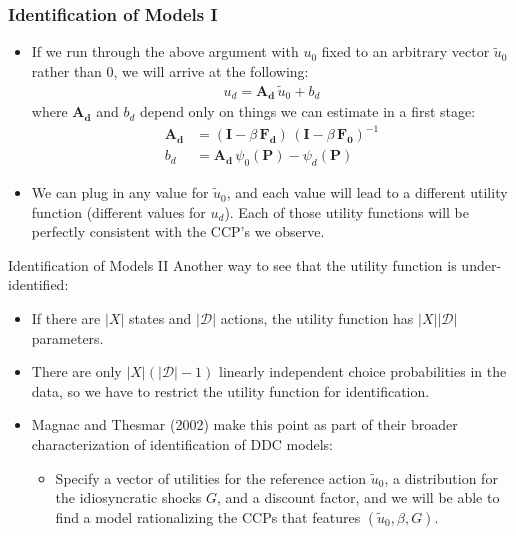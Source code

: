 \documentclass[aspectratio=169,11pt]{beamer}
\begin{document}
\begin{frame}
\frametitle{Identification of Models I}
\begin{itemize}
	\item If we  run through the above argument with $u_{0}$ fixed to
	an arbitrary vector $\widetilde{u}_{0}$ rather than 0, we will arrive at the
	following:
	\begin{align*}
		u_{d} = \symbf{A_{d}} \, \widetilde{u}_{0} + b_{d}
	\end{align*}
	where $ \symbf{A_{d}} $ and $b_{d} $ depend only on things we can estimate in a first
	stage:
	\begin{align*}
	\symbf{A_{d}} & = \left(\symbf{I}-\beta\, \symbf{F_{d}}\right) \, \left(\symbf{I}-\beta\,  \symbf{F_{0}}\right)^{-1}\\
	b_{d} & = \symbf{A_{d}}\, \psi_{0}\left(\symbf{P}\right)-\psi_{d}\left(\symbf{P}\right)
	\end{align*}
	\item We can plug in any value for $\widetilde{u}_{0}$, and each value
	will lead to a different utility function (different values for $u_{d}$). Each
	of those utility functions will be perfectly consistent with the CCP's we observe.
\end{itemize}
\end{frame}

\begin{frame}{Identification of Models II}
Another way to see that the utility function is under-identified:
\begin{itemize}
\item If there are $\left|X\right|$ states and $\left|\mathcal{D}\right|$ actions,
the utility function has $\left|X\right|\left|\mathcal{D}\right|$ parameters.
\item There are only $\left|X\right|\left(\left|\mathcal{D}\right|-1\right)$
linearly independent choice probabilities in the data, so we have
to restrict the utility function for identification.
\item Magnac and Thesmar (2002) make this point as part of their broader
characterization of identification of DDC models:
\begin{itemize}
\item Specify a vector of utilities for the reference action
$\widetilde{u}_0$, a distribution for the idiosyncratic shocks $G$,
and a discount factor, and we will be able to find a model rationalizing
the CCPs that features $\left(\widetilde{u}_0,\beta,G\right)$.
\end{itemize}
\end{itemize}
\end{frame}
\end{document}
